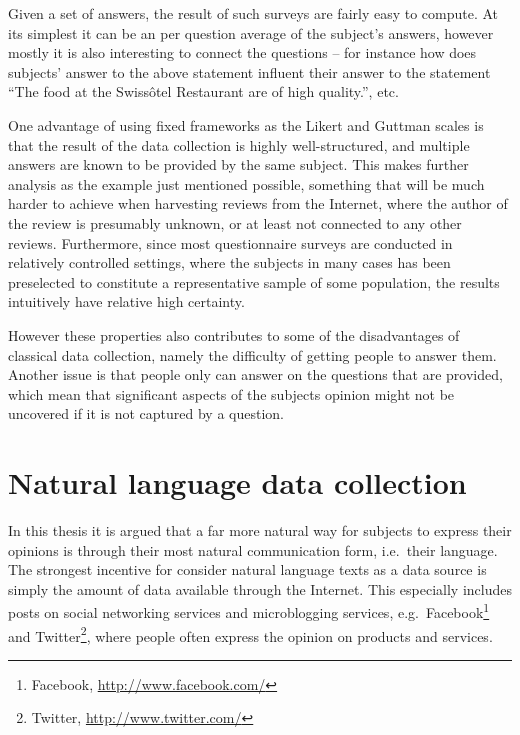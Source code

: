 Given a set of answers, the result of such surveys are fairly easy to compute. At its simplest it can be an per question average of the subject's answers, however mostly it is also interesting to connect the questions -- for instance how does subjects' answer to the above statement influent their answer to the statement ``The food at the Swissôtel Restaurant are of high quality.'', etc. 

One advantage of using fixed frameworks as the Likert and Guttman scales is that the result of the data collection is highly well-structured, and multiple answers are known to be provided by the same subject. This makes further analysis as the example just mentioned possible, something that will be much harder to achieve when harvesting reviews from the Internet, where the author of the review is presumably unknown, or at least not connected to any other reviews. Furthermore, since most questionnaire surveys are conducted in relatively controlled settings, where the subjects in many cases has been preselected to constitute a representative sample of some population, the results intuitively have relative high certainty.

However these properties also contributes to some of the disadvantages of classical data collection, namely the difficulty of getting people to answer them. Another issue is that people only can answer on the questions that are provided, which mean that significant aspects of the subjects opinion might not be uncovered if it is not captured by a question.

\section{Natural language data collection}
\label{sec:naturalDataCollection}

In this thesis it is argued that a far more natural way for subjects to express their opinions is through their most natural communication form, i.e.\ their language. The strongest incentive for consider natural language texts as a data source is simply the amount of data available through the Internet. This especially includes posts on social networking services and microblogging services, e.g.\ Facebook\footnote{Facebook, \url{http://www.facebook.com/}} and Twitter\footnote{Twitter, \url{http://www.twitter.com/}}, where people often express the opinion on products and services.

